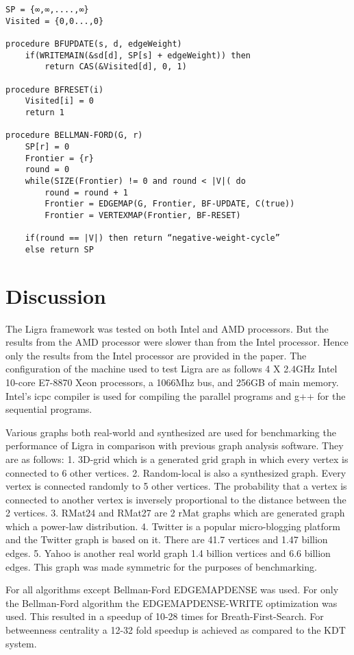 \documentclass[a4paper,10pt,twoside]{article}
\begin{document}
\begin{lstlisting}
SP = {∞,∞,....,∞}
Visited = {0,0...,0}

procedure BFUPDATE(s, d, edgeWeight)
	if(WRITEMAIN(&sd[d], SP[s] + edgeWeight)) then
		return CAS(&Visited[d], 0, 1)

procedure BFRESET(i)
	Visited[i] = 0
	return 1

procedure BELLMAN-FORD(G, r)
	SP[r] = 0
	Frontier = {r}
	round = 0
	while(SIZE(Frontier) != 0 and round < |V|( do
		round = round + 1
		Frontier = EDGEMAP(G, Frontier, BF-UPDATE, C(true))
		Frontier = VERTEXMAP(Frontier, BF-RESET)

	if(round == |V|) then return “negative-weight-cycle”
	else return SP

\end{lstlisting}


\section{Discussion}

The Ligra framework was tested on both Intel and AMD processors. But the results from the AMD processor were slower than from the Intel processor. Hence only the results from the Intel processor are provided in the paper. The configuration of the machine used to test Ligra are as follows 4 X 2.4GHz Intel 10-core E7-8870 Xeon processors, a 1066Mhz bus, and 256GB of main memory. Intel's icpc compiler is used for compiling the parallel programs and g++ for the sequential programs.

	Various graphs both real-world and synthesized are used for benchmarking the performance of Ligra in comparison with previous graph analysis software. They are as follows:
1. 3D-grid which is a generated grid graph in which every vertex is connected to 6 other vertices.
2. Random-local is also a synthesized graph. Every vertex is connected randomly to 5 other vertices. The probability that a vertex is connected to another vertex is inversely proportional to the distance between the 2 vertices.
3. RMat24 and RMat27 are 2 rMat graphs which are generated graph which a power-law distribution.
4. Twitter is a popular micro-blogging platform and the Twitter graph is based on it. There are 41.7 vertices and 1.47 billion edges.
5. Yahoo is another real world graph 1.4 billion vertices and 6.6 billion edges. This graph was made symmetric for the purposes of benchmarking.

For all algorithms except Bellman-Ford EDGEMAPDENSE was used. For only the Bellman-Ford algorithm the EDGEMAPDENSE-WRITE optimization was used. This resulted in a speedup of 10-28 times for Breath-First-Search. For betweenness centrality a 12-32 fold speedup is achieved as compared to the KDT system.
\end{document}
